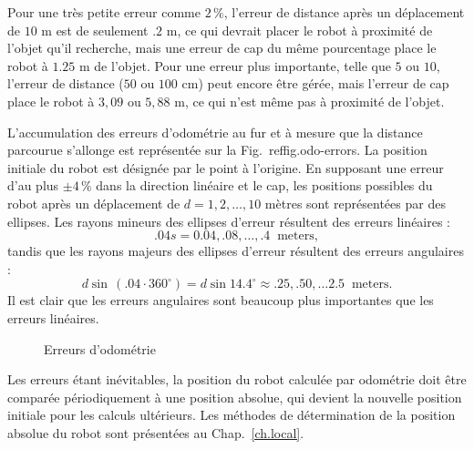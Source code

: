 {Pour une très petite erreur comme $2\,\%$, l'erreur de distance après un déplacement de $10$ m est de seulement $.2$ m, ce qui devrait placer le robot à proximité de l'objet qu'il recherche, mais une erreur de cap du même pourcentage place le robot à $1.25$ m de l'objet. Pour une erreur plus importante, telle que $5$ ou $10$, l'erreur de distance ($50$ ou $100$ cm) peut encore être gérée, mais l'erreur de cap place le robot à $3,09$ ou $5,88$ m, ce qui n'est même pas à proximité de l'objet.

L'accumulation des erreurs d'odométrie au fur et à mesure que la distance parcourue s'allonge est représentée sur la Fig.~ref{fig.odo-errors}. La position initiale du robot est désignée par le point à l'origine.  En supposant une erreur d'au plus $\pm 4\,\%$ dans la direction linéaire et le cap, les positions possibles du robot après un déplacement de $d=1,2,\ldots,10$ mètres sont représentées par des ellipses. Les rayons mineurs des ellipses d'erreur résultent des erreurs linéaires :
\[.04s = 0.04, .08, \ldots, .4 \;\;\textrm{meters},
\]
tandis que les rayons majeurs des ellipses d'erreur résultent des erreurs angulaires :
\[
d\sin \,(.04\cdot 360^\circ)=d \sin 14.4^\circ \approx{} .25, .50, \ldots 2.5\;\;\textrm{meters}.
\]
Il est clair que les erreurs angulaires sont beaucoup plus importantes que les erreurs linéaires.

\begin{figure}
\begin{center}
\end{center}
\caption{Erreurs d'odométrie}\label{fig.odo-errors}
\end{figure}

Les erreurs étant inévitables, la position du robot calculée par odométrie doit être comparée périodiquement à une position absolue, qui devient la nouvelle position initiale pour les calculs ultérieurs. Les méthodes de détermination de la position absolue du robot sont présentées au Chap.~\ref{ch.local}.

}
